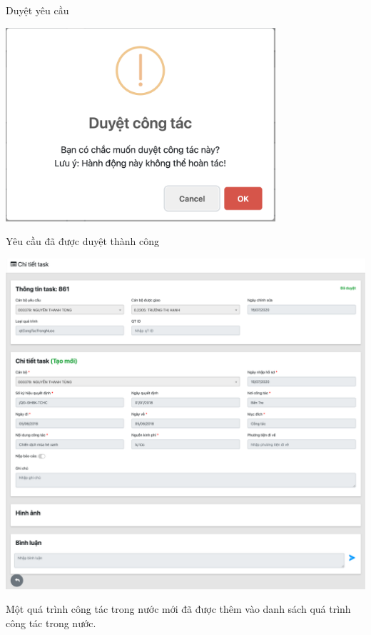 \noindent Duyệt yêu cầu
\begin{center}
  \captionsetup{type=figure}
  \includegraphics[width=10cm]{img/test/confirmApprove.png}
\end{center}
Yêu cầu đã được duyệt thành công
\begin{center}
  \captionsetup{type=figure}
  \includegraphics[width=15cm]{img/test/approved.png}
\end{center}
Một quá trình công tác trong nước mới đã được thêm vào danh sách quá trình công tác trong nước.
